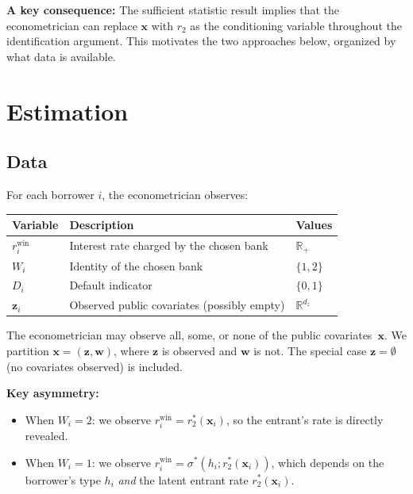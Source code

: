 \documentclass[12pt]{article}
\theoremstyle{plain}
\theoremstyle{plain}
\theoremstyle{definition}  %
\theoremstyle{remark}  %
\begin{document}
\medskip\noindent
\textbf{A key consequence:} The sufficient statistic result implies that the econometrician can replace $\mathbf{x}$ with $r_2$ as the conditioning variable throughout the identification argument. This motivates the two approaches below, organized by what data is available.




\newpage
\section{Estimation}\label{sec:estimation}

\subsection{Data}\label{sec:data}

For each borrower $i$, the econometrician observes:
\begin{center}
\renewcommand{\arraystretch}{1.3}
\begin{tabular}{lll}
\toprule
\textbf{Variable} & \textbf{Description} & \textbf{Values} \\
\midrule
$r_i^{\text{win}}$ & Interest rate charged by the chosen bank & $\mathbb{R}_+$ \\
$W_i$ & Identity of the chosen bank & $\{1, 2\}$ \\
$D_i$ & Default indicator & $\{0, 1\}$ \\
$\mathbf{z}_i$ & Observed public covariates (possibly empty) & $\mathbb{R}^{d_z}$ \\
\bottomrule
\end{tabular}
\end{center}

\medskip\noindent
The econometrician may observe all, some, or none of the public covariates~$\mathbf{x}$. We partition $\mathbf{x} = (\mathbf{z}, \mathbf{w})$, where $\mathbf{z}$ is observed and $\mathbf{w}$ is not. The special case $\mathbf{z} = \emptyset$ (no covariates observed) is included.

\medskip\noindent
\textbf{Key asymmetry:}
\begin{itemize}
    \item When $W_i = 2$: we observe $r_i^{\text{win}} = r_2^*(\mathbf{x}_i)$, so the entrant's rate is directly revealed.
    \item When $W_i = 1$: we observe $r_i^{\text{win}} = \sigma^*(h_i; r_2^*(\mathbf{x}_i))$, which depends on the borrower's type $h_i$ \emph{and} the latent entrant rate $r_2^*(\mathbf{x}_i)$.
\end{itemize}
\end{document}
